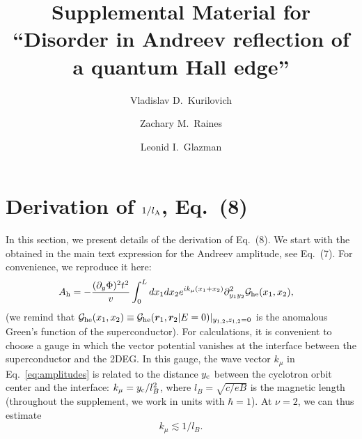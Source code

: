 \documentclass[pra,aps,a4paper,twocolumn,superscriptaddress,longbibliography]{revtex4-2}
\newcommand{\lprox}{L}
\newcommand{\kf}{k_\mu}
\newcommand{\lA}{l_{\rm A}}
\newcommand{\he}{A_{\rm h}}
\begin{document}
\title{Supplemental Material for ``Disorder in Andreev reflection of a quantum Hall edge''}

\author{Vladislav D.~Kurilovich}
\author{Zachary M.~Raines}
\author{Leonid I.~Glazman}

\maketitle

\onecolumngrid
\vspace*{-5mm}

\section{Derivation of $1/\lA$, Eq.~(8)\label{sec:lA}}

In this section, we present details of the derivation of Eq.~(8).
We start with the obtained in the main text expression for the Andreev amplitude, see Eq.~(7). For convenience, we reproduce it here:
\begin{align}\label{eq:amplitudes}
    \he &= -\frac{(\partial_y \Phi)^2 t^2}{v}\int_0^\lprox dx_1 dx_2 e^{i\kf (x_1 + x_2)}\partial^2_{y_1 y_2}{\cal G}_{\rm he} (x_1, x_2),
\end{align}
(we remind that ${\cal G}_{\rm he}(x_1, x_2) \equiv {\cal G}_{\rm he}(\bm r_1, \bm r_2 | E = 0)|_{y_{1,2}, z_{1,2} = 0}$ is the anomalous Green's function of the superconductor).
For calculations, it is convenient to choose a gauge in which the vector potential vanishes at the interface between the superconductor and the 2DEG.
In this gauge, the wave vector $k_\mu$ in Eq.~\eqref{eq:amplitudes} is related to the distance $y_{\rm c}$ between the cyclotron orbit center and the interface: $k_\mu = y_{\rm c} / l_B^2$, where $l_B = \sqrt{c / e B}$ is the magnetic length (throughout the supplement, we work in units with $\hbar = 1$). At $\nu = 2$, we can thus estimate 
\begin{equation}
    k_\mu \lesssim 1 / l_B.
\end{equation}
\end{document}
